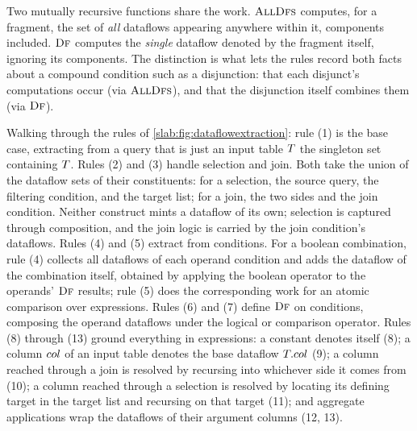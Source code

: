 Two mutually recursive functions share the work. $\textsc{AllDfs}$
computes, for a fragment, the set of \emph{all} dataflows appearing
anywhere within it, components included. $\textsc{Df}$ computes the
\emph{single} dataflow denoted by the fragment itself, ignoring its
components. The distinction is what lets the rules record both facts
about a compound condition such as a disjunction: that each disjunct's
computations occur (via $\textsc{AllDfs}$), and that the disjunction
itself combines them (via $\textsc{Df}$).

Walking through the rules of \cref{slab:fig:dataflowextraction}: rule
(1) is the base case, extracting from a query that is just an input
table $T$ the singleton set containing $T$. Rules (2)
and (3) handle selection and join. Both take the union of the dataflow
sets of their constituents: for a selection, the source query, the
filtering condition, and the target list; for a join, the two sides
and the join condition. Neither construct mints a dataflow of its own;
selection is captured through composition, and the join logic is
carried by the join condition's dataflows. Rules (4) and (5) extract
from conditions. For a boolean combination, rule (4) collects all
dataflows of each operand condition and adds the dataflow of the
combination itself, obtained by applying the boolean operator to the
operands' $\textsc{Df}$ results; rule (5) does the corresponding work
for an atomic comparison over expressions. Rules (6) and (7) define
$\textsc{Df}$ on conditions, composing the operand dataflows under the
logical or comparison operator. Rules (8) through (13) ground
everything in expressions: a constant denotes itself (8); a column
$col$ of an input table denotes the base dataflow $T.col$
(9); a column reached through a join is resolved by recursing into
whichever side it comes from (10); a column reached through a
selection is resolved by locating its defining target in the target
list and recursing on that target (11); and aggregate applications
wrap the dataflows of their argument columns (12, 13).

